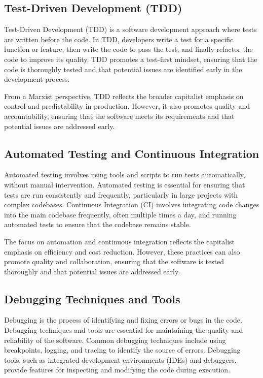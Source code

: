 \begin{refsection}
\begin{multicols}{2}
{\subsection{Test-Driven Development (TDD)}

Test-Driven Development (TDD) is a software development approach where tests are written before the code. In TDD, developers write a test for a specific function or feature, then write the code to pass the test, and finally refactor the code to improve its quality. TDD promotes a test-first mindset, ensuring that the code is thoroughly tested and that potential issues are identified early in the development process.

From a Marxist perspective, TDD reflects the broader capitalist emphasis on control and predictability in production. However, it also promotes quality and accountability, ensuring that the software meets its requirements and that potential issues are addressed early.

\subsection{Automated Testing and Continuous Integration}

Automated testing involves using tools and scripts to run tests automatically, without manual intervention. Automated testing is essential for ensuring that tests are run consistently and frequently, particularly in large projects with complex codebases. Continuous Integration (CI) involves integrating code changes into the main codebase frequently, often multiple times a day, and running automated tests to ensure that the codebase remains stable.

The focus on automation and continuous integration reflects the capitalist emphasis on efficiency and cost reduction. However, these practices can also promote quality and collaboration, ensuring that the software is tested thoroughly and that potential issues are addressed early.

\subsection{Debugging Techniques and Tools}

Debugging is the process of identifying and fixing errors or bugs in the code. Debugging techniques and tools are essential for maintaining the quality and reliability of the software. Common debugging techniques include using breakpoints, logging, and tracing to identify the source of errors. Debugging tools, such as integrated development environments (IDEs) and debuggers, provide features for inspecting and modifying the code during execution.

}
\end{multicols}
\end{refsection}
